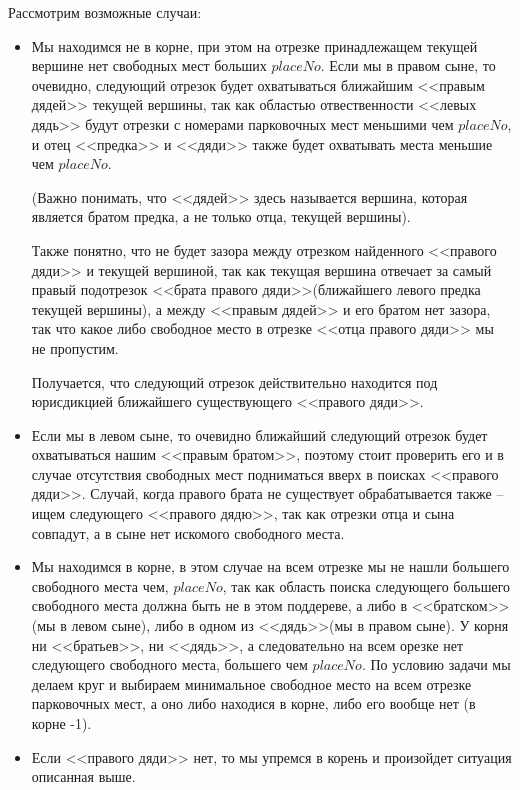 \documentclass[12pt]{article}
\begin{document}
Рассмотрим возможные случаи:
\begin{itemize}
    \item Мы находимся не в корне, при этом на отрезке принадлежащем текущей вершине
          нет свободных мест больших $ placeNo $. Если мы в правом сыне, то очевидно,
          следующий отрезок будет охватываться ближайшим <<правым дядей>> текущей вершины,
          так как областью отвественности <<левых дядь>> будут отрезки
          с номерами парковочных мест меньшими чем $ placeNo $, и отец <<предка>>
          и <<дяди>> также будет охватывать места меньшие чем $ placeNo $.

          (Важно понимать, что <<дядей>> здесь называется вершина, которая является
          братом предка, а не только отца, текущей вершины).

          Также понятно, что не будет зазора между отрезком найденного <<правого дяди>>
          и текущей вершиной, так как текущая вершина отвечает за самый правый подотрезок
          <<брата правого дяди>>(ближайшего левого предка текущей вершины), а между
          <<правым дядей>> и его братом нет зазора, так что какое либо свободное место в
          отрезке <<отца правого дяди>> мы не пропустим.

          Получается, что следующий отрезок действительно находится под юрисдикцией
          ближайшего существующего <<правого дяди>>.

    \item Если мы в левом сыне, то очевидно ближайший следующий отрезок будет охватываться
          нашим <<правым братом>>, поэтому стоит проверить его и в случае отсутствия
          свободных мест подниматься вверх в поисках <<правого дяди>>. Случай, когда
          правого брата не существует обрабатывается также -- ищем следующего <<правого
          дядю>>, так как отрезки отца и сына совпадут, а в сыне нет искомого свободного
          места.

    \item Мы находимся в корне, в этом случае на всем отрезке мы не нашли
          большего свободного места чем, $ placeNo $, так как область поиска
          следующего большего свободного места должна быть не в этом поддереве, а
          либо в <<братском>>(мы в левом сыне), либо в одном из <<дядь>>(мы в правом сыне).
          У корня ни <<братьев>>, ни <<дядь>>, а следовательно на всем орезке
          нет следующего свободного места, большего чем $ placeNo $. По
          условию задачи мы делаем круг и выбираем минимальное свободное
          место на всем отрезке парковочных мест, а оно либо находися в корне,
          либо его вообще нет (в корне -1).

    \item Если <<правого дяди>> нет, то мы упремся в корень и произойдет ситуация
          описанная выше.
\end{itemize}
\end{document}
